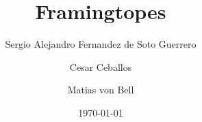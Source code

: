 \documentclass[12pt, reqno]{amsart}
\theoremstyle{plain}
\theoremstyle{definition}
\numberwithin{equation}{section}
\begin{document}
\title{Framingtopes}

\author[Fernandez de soto]{Sergio Alejandro Fernandez de Soto Guerrero}
\address[S. Fernandez de soto]{Institute of Discrete Mathematics, Technische Universität Graz, Austria, Graz, Austria}


\author[Ceballos]{Cesar Ceballos}
\address[C. Ceballos]{Technische Universit\"at Graz}


\author[von Bell]{Matias von Bell}
\address[M. von Bell]{Indiana University Southeast}




\date{\today} %



\end{document}
